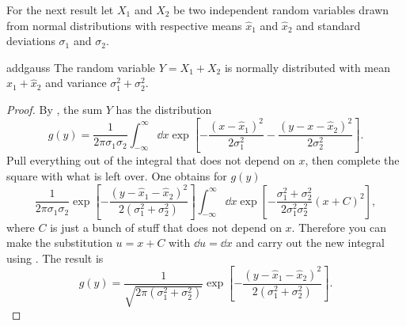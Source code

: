 For the next result 
let $X_1$ and $X_2$ be two independent random variables drawn from normal
distributions with respective means $\hat{x}_1$ and $\hat{x}_2$ and
standard deviations $\sigma_1$ and $\sigma_2$. 
\begin{proposition}{}{addgauss}
  The random variable $Y=X_1+X_2$ is normally distributed with mean
  $\hat{x}_1+\hat{x}_2$ and variance $\sigma_1^2+\sigma_2^2$.
  \begin{proof}
    By , the sum $Y$ has the distribution
    \begin{equation*}
      g(y)=\frac{1}{2\pi\sigma_1\sigma_2}
           \int_{-\infty}^\infty\dd{x}\exp\left[
             -\frac{(x-\hat{x}_1)^2}{2\sigma_1^2}
             -\frac{(y-x-\hat{x}_2)^2}{2\sigma_2^2}\right].
    \end{equation*}
    Pull everything out of the integral that does not depend on $x$,
    then complete the square with what is left over.
    One obtains for $g(y)$
    $$
      \frac{1}{2\pi\sigma_1\sigma_2}
           \exp\left[-\frac{(y-\hat{x}_1-\hat{x}_2)^2}
                      {2(\sigma_1^2+\sigma_2^2)}\right]
           \int_{-\infty}^\infty\dd{x}
           \exp\left[-\frac{\sigma_1^2+\sigma_2^2}
                     {2\sigma_1^2\sigma_2^2}(x+C)^2\right],
    $$
    where $C$ is just a bunch of stuff that does not depend on $x$.
    Therefore you can make the substitution $u=x+C$ with $\dd u=\dd x$ and
    carry out the new integral using .
    The result is
    \begin{equation*}
      g(y)=\frac{1}{\sqrt{2\pi(\sigma_1^2+\sigma_2^2)}}
           \exp\left[-\frac{(y-\hat{x}_1-\hat{x}_2)^2}
                      {2(\sigma_1^2+\sigma_2^2)}\right].
    \end{equation*}
  \end{proof}
\end{proposition}

